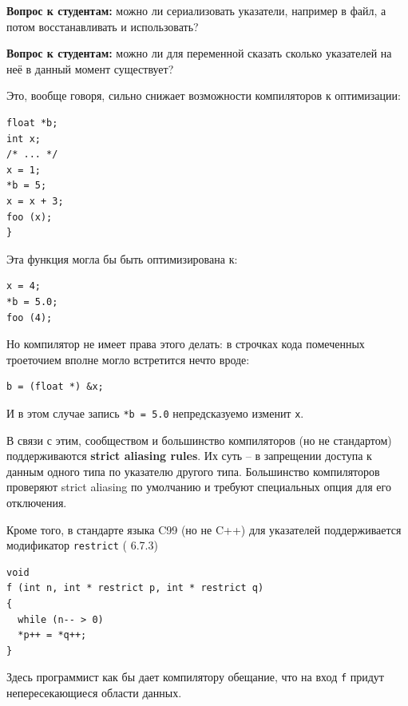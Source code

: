 \documentclass[a4paper,12pt,oneside]{article}
\newif\ifanswers
\begin{document}
\textbf{Вопрос к студентам:} можно ли сериализовать указатели, например в файл, а потом восстанавливать и использовать?

\ifanswers
Ответ: да, в течении срока жизни того, на что они указывают.
\fi

\textbf{Вопрос к студентам:} можно ли для переменной сказать сколько указателей на неё в данный момент существует?

\ifanswers
Ответ: увы, нет. Никакая переменная не ``знает'' о том, что кто-то взял её адрес и т.п.
\fi

Это, вообще говоря, сильно снижает возможности компиляторов к оптимизации:

\begin{lstlisting}
float *b; 
int x;
/* ... */
x = 1;
*b = 5;
x = x + 3;
foo (x);
}
\end{lstlisting}

Эта функция могла бы быть оптимизирована к:

\begin{lstlisting}
x = 4;
*b = 5.0;
foo (4);
\end{lstlisting}

Но компилятор не имеет права этого делать: в строчках кода помеченных троеточием вполне могло встретится нечто вроде:

\begin{lstlisting}
b = (float *) &x;
\end{lstlisting}

И в этом случае запись \lstinline!*b = 5.0! непредсказуемо изменит \lstinline!x!.

В связи с этим, сообществом и большинство компиляторов (но не стандартом) поддерживаются \textbf{strict aliasing rules}\label{StrictAliasing}. Их суть -- в запрещении доступа к данным одного типа по указателю другого типа. Большинство компиляторов проверяют strict aliasing по умолчанию и требуют специальных опция для его отключения.

Кроме того, в стандарте языка C99 (но не C++) для указателей поддерживается модификатор \lstinline!restrict! (\cite{stdc99} 6.7.3)

\begin{lstlisting}
void 
f (int n, int * restrict p, int * restrict q)
{
  while (n-- > 0)
  *p++ = *q++;
}
\end{lstlisting}

Здесь программист как бы дает компилятору обещание, что на вход \lstinline!f! придут непересекающиеся области данных.
\end{document}
